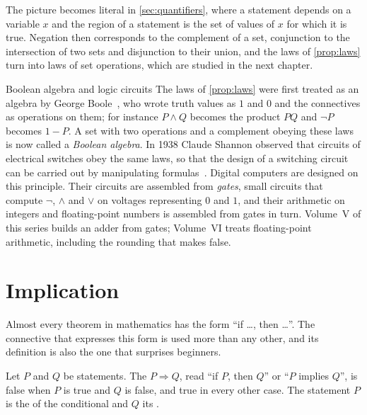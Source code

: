 The picture becomes literal in \cref{sec:quantifiers}, where a statement depends on a variable $x$ and the region of a statement is the set of values of $x$ for which it is true. Negation then corresponds to the complement of a set, conjunction to the intersection of two sets and disjunction to their union, and the laws of \cref{prop:laws} turn into laws of set operations, which are studied in the next chapter.

\begin{note}{Boolean algebra and logic circuits}
The laws of \cref{prop:laws} were first treated as an algebra by George Boole~\cite{boole1847,boole1854}, who wrote truth values as $1$ and $0$ and the connectives as operations on them; for instance $P\wedge Q$ becomes the product $PQ$ and $\neg P$ becomes $1-P$. A set with two operations and a complement obeying these laws is now called a \emph{Boolean algebra}. In 1938 Claude Shannon observed that circuits of electrical switches obey the same laws, so that the design of a switching circuit can be carried out by manipulating formulas~\cite{shannon1938}. Digital computers are designed on this principle. Their circuits are assembled from \emph{gates}, small circuits that compute $\neg$, $\wedge$ and $\vee$ on voltages representing $0$ and $1$, and their arithmetic on integers and floating-point numbers is assembled from gates in turn. Volume~V of this series builds an adder from gates; Volume~VI treats floating-point arithmetic, including the rounding that makes  false.
\end{note}

\section{Implication}
\label{sec:implication}

Almost every theorem in mathematics has the form ``if \ldots, then \ldots''. The connective that expresses this form is used more than any other, and its definition is also the one that surprises beginners.

\begin{definition}[Conditional]
\label{def:conditional}
Let $P$ and $Q$ be statements. The  $P\Rightarrow Q$, read ``if $P$, then $Q$'' or ``$P$ implies $Q$'', is false when $P$ is true and $Q$ is false, and true in every other case. The statement $P$ is the  of the conditional and $Q$ its .
\end{definition}

